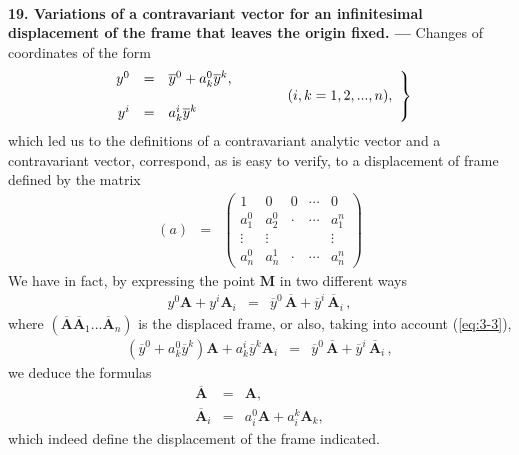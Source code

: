
\ \\

{\bf 19. Variations of a contravariant vector for an infinitesimal displacement of the frame that leaves the origin fixed. --- }
% 
Changes of coordinates of the form 
\begin{eqnarray}
\left. \begin{array}{rcl}
y^0 &=& \overline y^0 + a^0_k \overline y^k , \\
&&\hspace*{3cm} (i, k = 1,2,...,n) , \\
y^i &=&  a^i_k \overline y^k 
\end{array} \right\}
\label{eq:3-3}
\end{eqnarray}
which led us to the definitions of a contravariant analytic vector and a contravariant vector, correspond, as is easy to verify, to a displacement of frame defined by the matrix
\begin{eqnarray*}
(a) &=& \left(
\begin{array}{ccccc}
 1 & 0  & 0 & \cdots & 0 \\
 a^0_1 &  a^0_2 & \cdot & \cdots & a^n_1 \\
 \vdots & \vdots  &   &  & \vdots \\
 a^0_n &  a^1_n & \cdot & \cdots & a^n_n 
\end{array}
\right)
\end{eqnarray*}
 We have in fact, by expressing the point $\bm M$ in two different ways
 \begin{eqnarray*}
y^0 \bm A + y^i \bm A_i &=& \overline y^0 \, \overline{\bm A} + \overline y^i\, \overline{\bm A}_i\, , 
\end{eqnarray*}
where $(\overline{\bm A} \overline{\bm A}_1 ... \overline{\bm A}_n)$ is the displaced frame, or also, taking into account  (\ref{eq:3-3}), 
 \begin{eqnarray*}
(\overline y^0 + a^0_k \overline y^k )  \bm A + a^i_k \overline y^k  \bm A_i &=& \overline y^0 \, \overline{\bm A} + \overline y^i\, \overline{\bm A}_i\, , 
\end{eqnarray*}
we deduce the formulas
\begin{eqnarray*}
\overline{\bm A} &=& \bm A , \\
\overline{\bm A}_i &=& a^0_i \bm A + a^k_i \bm A_k,
\end{eqnarray*}
which indeed define the displacement of the frame indicated. 

